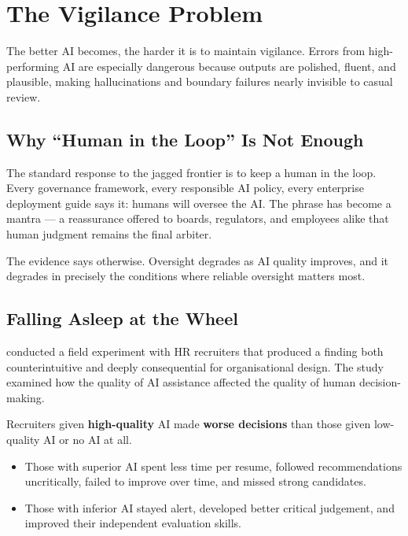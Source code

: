 \chapter{The Vigilance Problem}
\label{ch:vigilance}

\epigraph{The better AI becomes, the harder it is to maintain vigilance. Errors from high-performing AI are especially dangerous because outputs are polished, fluent, and plausible, making hallucinations and boundary failures nearly invisible to casual review.}{}

\section{Why ``Human in the Loop'' Is Not Enough}

The standard response to the jagged frontier is to keep a human in the loop. Every governance framework, every responsible AI policy, every enterprise deployment guide says it: humans will oversee the AI. The phrase has become a mantra --- a reassurance offered to boards, regulators, and employees alike that human judgment remains the final arbiter.

The evidence says otherwise. Oversight degrades as AI quality improves, and it degrades in precisely the conditions where reliable oversight matters most.

\section{Falling Asleep at the Wheel}

\textcite{DellAcqua2023} conducted a field experiment with HR recruiters that produced a finding both counterintuitive and deeply consequential for organisational design. The study examined how the quality of AI assistance affected the quality of human decision-making.

\begin{evidencebox}[title={The Counterintuitive Finding}]
Recruiters given \textbf{high-quality} AI made \textbf{worse decisions} than those given low-quality AI or no AI at all.
\begin{itemize}
  \item Those with superior AI spent less time per resume, followed recommendations uncritically, failed to improve over time, and missed strong candidates.
  \item Those with inferior AI stayed alert, developed better critical judgement, and improved their independent evaluation skills.
\end{itemize}
\end{evidencebox}

